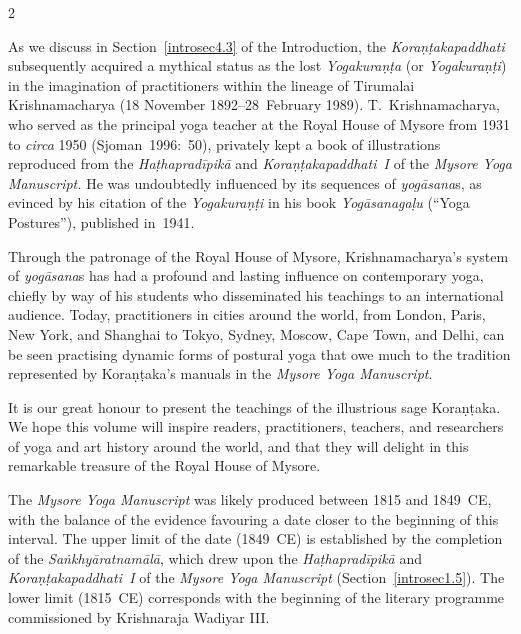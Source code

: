\begin{nohyp}
\begin{multicols*}{2}
\begin{eng}
As we discuss in Section~\ref{introsec4.3} of the Introduction, the \emph{Koraṇṭakapaddhati} subsequently acquired a mythical status as the lost \emph{Yogakuraṇṭa} (or \emph{Yogakuraṇṭi}) in the imagination of practitioners within the lineage of Tirumalai Krishnamacharya (18 November 1892--28~February 1989). T.~Krishnamacharya, who served as the principal yoga teacher at the Royal House of Mysore from 1931 to \emph{circa} 1950 (Sjoman~1996:~50), privately kept a book of illustrations reproduced from the \emph{Haṭhapradīpikā} and \emph{Koraṇṭakapaddhati~I} of the \emph{Mysore Yoga Manuscript.} He was undoubtedly influenced by its sequences of \emph{yogāsana}s, as evinced by his citation of the \emph{Yogakuraṇṭi} in his book \emph{Yogāsanagaḷu} (``Yoga Postures''), published in~1941.

Through the patronage of the Royal House of Mysore, Krishnamacharya's system of \emph{yogāsana}s has had a profound and lasting influence on contemporary yoga, chiefly by way of his students who disseminated his teachings to an international audience. Today, practitioners in cities around the world, from London, Paris, New York, and Shanghai to Tokyo, Sydney, Moscow, Cape Town, and Delhi, can be seen practising dynamic forms of postural yoga that owe much to the tradition represented by Koraṇṭaka's manuals in the \emph{Mysore Yoga Manuscript}.

It is our great honour to present the teachings of the illustrious sage Koraṇṭaka. We hope this volume will inspire readers, practitioners, teachers, and researchers of yoga and art history around the world, and that they will delight in this remarkable treasure of the Royal House of Mysore.
\vskip 18pt

\label{introsec1.1}
\vskip 9pt

\noindent
The \emph{Mysore Yoga Manuscript} was likely produced between 1815 and 1849~CE, with the balance of the evidence favouring a date closer to the beginning of this interval. The upper limit of the date (1849~CE) is established by the completion of the \emph{Saṅkhyāratnamālā}, which drew upon the \emph{Haṭhapradīpikā} and \emph{Koraṇṭakapaddhati~I} of the \emph{Mysore Yoga Manuscript} (Section~\ref{introsec1.5}). The lower limit (1815~CE) corresponds with the beginning of the literary programme commissioned by Krishnaraja Wadiyar III.


\end{eng}
\end{multicols*}
\end{nohyp}
